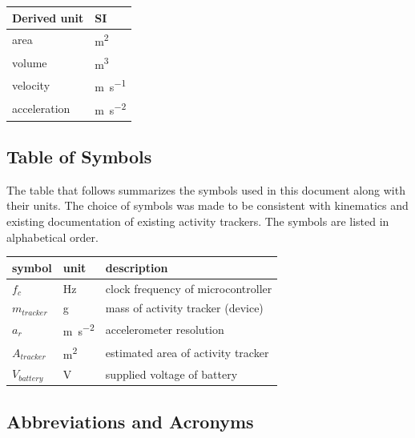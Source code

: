\documentclass[12pt]{article}
\begin{document}
\renewcommand{\arraystretch}{1.2}
\noindent \begin{tabular}{l l}
  \toprule
  \textbf{Derived unit} & \textbf{SI}                   \\
  \midrule
  area                  & \si{\square\metre}            \\
  volume                & \si{\cubic\metre}             \\
  velocity              & \si{\metre\per\second}        \\
  acceleration          & \si{\metre\per\square\second} \\
  \bottomrule
\end{tabular}



\subsection{Table of Symbols}

The table that follows summarizes the symbols used in this document along with
their units.  The choice of symbols was made to be consistent with kinematics and existing documentation of existing activity trackers. The symbols are listed in alphabetical order.

\renewcommand{\arraystretch}{1.2}
\noindent \begin{longtable*}{l l p{12cm}} \toprule
  \textbf{symbol} & \textbf{unit} & \textbf{description}\\
  \midrule
  $f_c$ & \si{\Hz} & clock frequency of microcontroller\\
  $m_{tracker}$ & \si\g & mass of activity tracker (device)\\
  $a_r$ & \si{\metre\per\square\second} & accelerometer resolution\\
  $A_{tracker}$ & \si[per-mode=symbol] {\square\metre} & estimated area of activity tracker\\
  $V_{battery}$ & \si\V & supplied voltage of battery\\

  \bottomrule
\end{longtable*}

\subsection{Abbreviations and Acronyms}
\end{document}

